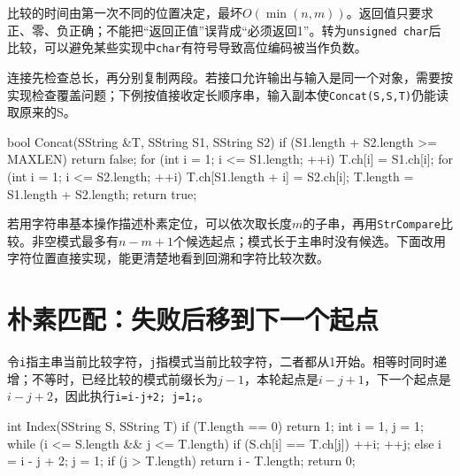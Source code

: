比较的时间由第一次不同的位置决定，最坏\(O(\min(n,m))\)。返回值只要求正、零、负正确；不能把``返回正值''误背成``必须返回1''。转为\texttt{unsigned char}后比较，可以避免某些实现中\texttt{char}有符号导致高位编码被当作负数。

连接先检查总长，再分别复制两段。若接口允许输出与输入是同一个对象，需要按实现检查覆盖问题；下例按值接收定长顺序串，输入副本使\texttt{Concat(\allowbreak{}S,\allowbreak{}S,\allowbreak{}T)\allowbreak{}}仍能读取原来的S。

\par\medskip\noindent\begin{minipage}{\linewidth}
\begin{codeblock}[language=C++]
bool Concat(SString &T, SString S1, SString S2) {
    if (S1.length + S2.length >= MAXLEN) return false;
    for (int i = 1; i <= S1.length; ++i)
        T.ch[i] = S1.ch[i];
    for (int i = 1; i <= S2.length; ++i)
        T.ch[S1.length + i] = S2.ch[i];
    T.length = S1.length + S2.length;
    return true;
}
\end{codeblock}
\end{minipage}\par\medskip

若用字符串基本操作描述朴素定位，可以依次取长度\(m\)的子串，再用\texttt{StrCompare}比较。非空模式最多有\(n-m+1\)个候选起点；模式长于主串时没有候选。下面改用字符位置直接实现，能更清楚地看到回溯和字符比较次数。

\section{朴素匹配：失败后移到下一个起点}\label{DS04-02}

令\texttt{i}指主串当前比较字符，\texttt{j}指模式当前比较字符，二者都从1开始。相等时同时递增；不等时，已经比较的模式前缀长为\(j-1\)，本轮起点是\(i-j+1\)，下一个起点是\(i-j+2\)，因此执行\texttt{i=\allowbreak{}i-j+\allowbreak{}2;\allowbreak{} j=\allowbreak{}1;\allowbreak{}}。

\par\medskip\noindent\begin{minipage}{\linewidth}
\begin{codeblock}[language=C++]
int Index(SString S, SString T) {
    if (T.length == 0) return 1;
    int i = 1, j = 1;
    while (i <= S.length && j <= T.length) {
        if (S.ch[i] == T.ch[j]) {
            ++i; ++j;
        } else {
            i = i - j + 2;
            j = 1;
        }
    }
    if (j > T.length) return i - T.length;
    return 0;
}
\end{codeblock}
\end{minipage}\par\medskip

